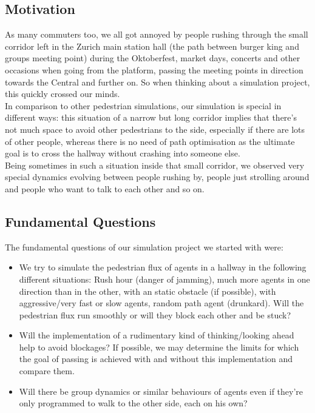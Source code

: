 

\subsection{Motivation}
As many commuters too, we all got annoyed by people rushing through the small corridor left in the Zurich main station hall (the path between burger king and groups meeting point) during the Oktoberfest, market days, concerts and other occasions when going from the platform, passing the meeting points in direction towards the Central and further on. So when thinking about a simulation project, this quickly crossed our minds.\\
In comparison to other pedestrian simulations, our simulation is special in different ways: this situation of a narrow but long corridor implies that there's not much space to avoid other pedestrians to the side, especially if there are lots of other people, whereas there is no need of path optimisation as the ultimate goal is to cross the hallway without crashing into someone else.\\
Being sometimes in such a situation inside that small corridor, we observed very special dynamics evolving between people rushing by, people just strolling around and people who want to talk to each other and so on.

\subsection{Fundamental Questions}
The fundamental questions of our simulation project we started with were:
\begin{itemize}
\item We try to simulate the pedestrian flux of agents in a hallway in the following different situations: Rush hour (danger of jamming), much more agents in one direction than in the other, with an static obstacle (if possible), with aggressive/very fast or slow agents, random path agent (drunkard). Will the pedestrian flux run smoothly or will they block each other and be stuck?
\item Will the implementation of a rudimentary kind of thinking/looking ahead help to avoid blockages? If possible, we may determine the limits for which the goal of passing is achieved with and without this implementation and compare them.
\item Will there be group dynamics or similar behaviours of agents even if they're only programmed to walk to the other side, each on his own?
\end{itemize}


